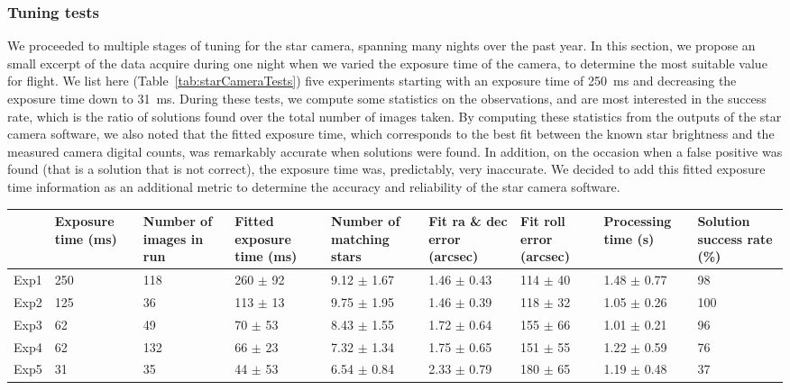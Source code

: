 \subsubsection{Tuning tests}

We proceeded to multiple stages of tuning for the star camera, spanning many nights over the past year. In this section, we propose an small excerpt of the data acquire during one night when we varied the exposure time of the camera, to determine the most suitable value for flight. We list here (Table~\ref{tab:starCameraTests}) five experiments starting with an exposure time of \SI{250}{\milli\second} and decreasing the exposure time down to \SI{31}{\milli\second}. During these tests, we compute some statistics on the observations, and are most interested in the success rate, which is the ratio of solutions found over the total number of images taken. By computing these statistics from the outputs of the star camera software, we also noted that the fitted exposure time, which corresponds to the best fit between the known star brightness and the measured camera digital counts, was remarkably accurate when solutions were found. In addition, on the occasion when a false positive was found (that is a solution that is not correct), the exposure time was, predictably, very inaccurate. We decided to add this fitted exposure time information as an additional metric to determine the accuracy and reliability of the star camera software. 


\renewcommand{\arraystretch}{1.5}
\def\labelitemi{--}
\begin{table}[!h]
\scriptsize
\caption[Star camera tests]{Star camera exposure time tests.}
\label{tab:starCameraTests}
\vspace{-0.5cm}
\begin{longtable}{l|P{1.5cm}P{1cm}P{1.5cm}P{1.5cm}P{1.5cm}P{1.5cm}P{1.5cm}P{1.5cm}}													
\toprule																							
{} 	&	  Exposure time (ms)	&	  Number of images in run 	&	  Fitted exposure time (ms)			&	  Number of matching stars 			&	  Fit ra \& dec error (arcsec) 			&	Fit roll error (arcsec)			&	  Processing time (s)			&	  Solution success rate (\%)	\\
\midrule																											
Exp1 	&	250	&	118	&	260	$\pm$	92	&	9.12	$\pm$	1.67	&	1.46	$\pm$	0.43	&	114	$\pm$	40	&	1.48	$\pm$	0.77	&	98	\\
Exp2 	&	125	&	36	&	113	$\pm$	13	&	9.75	$\pm$	1.95	&	1.46	$\pm$	0.39	&	118	$\pm$	32	&	1.05	$\pm$	0.26	&	100	\\
Exp3 	&	62	&	49	&	70	$\pm$	53	&	8.43	$\pm$	1.55	&	1.72	$\pm$	0.64	&	155	$\pm$	66	&	1.01	$\pm$	0.21	&	96	\\
Exp4 	&	62	&	132	&	66	$\pm$	23	&	7.32	$\pm$	1.34	&	1.75	$\pm$	0.65	&	151	$\pm$	55	&	1.22	$\pm$	0.59	&	76	\\
Exp5 	&	31	&	35	&	44	$\pm$	53	&	6.54	$\pm$	0.84	&	2.33	$\pm$	0.79	&	180	$\pm$	65	&	1.19	$\pm$	0.48	&	37	\\
\bottomrule
\end{longtable}																							
\end{table}																							

